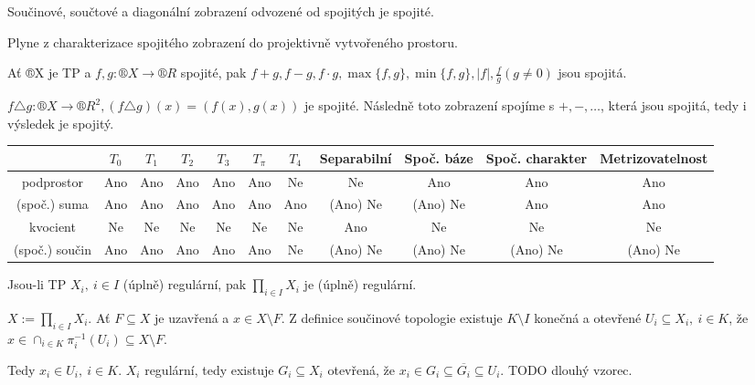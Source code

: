 \documentclass[12pt]{article}					%
\begin{document}
        \begin{tvrzeni}
            Součinové, součtové a diagonální zobrazení odvozené od spojitých je spojité.

            \begin{dukazin}
                Plyne z charakterizace spojitého zobrazení do projektivně vytvořeného prostoru.
            \end{dukazin}
        \end{tvrzeni}

        \begin{dusledek}
            Ať ®X je TP a $f, g: ®X \rightarrow ®R$ spojité, pak $f+g, f-g, f·g, \max\{f, g\}, \min\{f, g\}, |f|, \frac{f}{g} (g≠0)$ jsou spojitá.

            \begin{dukazin}
                $f\triangle g: ®X \rightarrow ®R^2, (f \triangle g)(x) = (f(x), g(x))$ je spojité. Následně toto zobrazení spojíme s $+, -, …$, která jsou spojitá, tedy i výsledek je spojitý.
            \end{dukazin}
        \end{dusledek}

        \begin{tabular}{|c|c|c|c|c|c|c|c|c|c|c|}
            \hline
                               & $T_0$ & $T_1$ & $T_2$ & $T_3$ & $T_\pi$ & $T_4$ & Separabilní & Spoč. báze & Spoč. charakter & Metrizovatelnost \\ \hline
                podprostor     & Ano   & Ano   & Ano   & Ano   & Ano     & Ne    & Ne          & Ano        & Ano             & Ano              \\ \hline
                (spoč.) suma   & Ano   & Ano   & Ano   & Ano   & Ano     & Ano   & (Ano) Ne    & (Ano) Ne   & Ano             & Ano              \\ \hline
                kvocient       & Ne    & Ne    & Ne    & Ne    & Ne      & Ne    & Ano         & Ne         & Ne              & Ne               \\ \hline
                (spoč.) součin & Ano   & Ano   & Ano   & Ano   & Ano     & Ne    & (Ano) Ne    & (Ano) Ne   & (Ano) Ne        & (Ano) Ne         \\ \hline
        \end{tabular}

        \begin{tvrzeni}
            Jsou-li TP $X_i,\ i\in I$ (úplně) regulární, pak $\prod_{i \in I} X_i$ je (úplně) regulární.

            \begin{dukazin}
                $X:= \prod_{i \in I} X_i$. Ať $F \subseteq X$ je uzavřená a $x \in X \setminus F$. Z definice součinové topologie existuje $K \setminus I$ konečná a otevřené $U_i \subseteq X_i,\ i \in K$, že $x \in \cap_{i \in K} \pi_i^{-1} (U_i) \subseteq X \setminus F$.

                Tedy $x_i \in U_i,\ i \in K$. $X_i$ regulární, tedy existuje $G_i \subseteq X_i$ otevřená, že $x_i \in G_i \subseteq \overline{G_i} \subseteq U_i$. TODO dlouhý vzorec.
            \end{dukazin}
        \end{tvrzeni}
\end{document}
